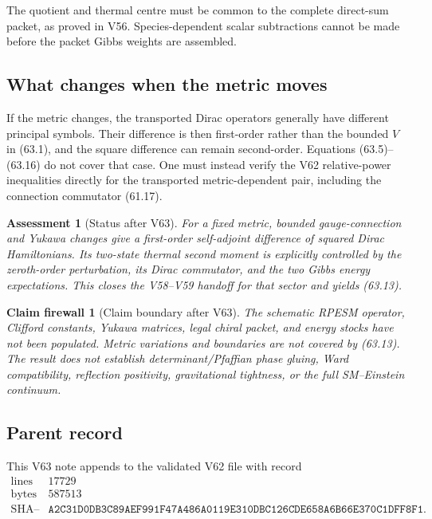 \documentclass[11pt]{article}
\newtheorem{firewall}[theorem]{Claim firewall}
\newtheorem{assessment}[theorem]{Assessment}
\theoremstyle{remark}
\begin{document}
The quotient and thermal centre must be common to the complete
direct-sum packet, as proved in V56.  Species-dependent scalar
subtractions cannot be made before the packet Gibbs weights are
assembled.

\subsection{What changes when the metric moves}

If the metric changes, the transported Dirac operators generally
have different principal symbols.  Their difference is then
first-order rather than the bounded \(V\) in (63.1), and the square
difference can remain second-order.  Equations (63.5)--(63.16) do
not cover that case.  One must instead verify the V62
relative-power inequalities directly for the transported
metric-dependent pair, including the connection commutator
(61.17).

\begin{assessment}[Status after V63]
\label{ass:v12v63-status}
For a fixed metric, bounded gauge-connection and Yukawa changes give
a first-order self-adjoint difference of squared Dirac
Hamiltonians.  Its two-state thermal second moment is explicitly
controlled by the zeroth-order perturbation, its Dirac commutator,
and the two Gibbs energy expectations.  This closes the V58--V59
handoff for that sector and yields (63.13).
\end{assessment}

\begin{firewall}[Claim boundary after V63]
\label{fire:v12v63-claim}
The schematic RPESM operator, Clifford constants, Yukawa matrices,
legal chiral packet, and energy stocks have not been populated.
Metric variations and boundaries are not covered by (63.13).
The result does not establish determinant/Pfaffian phase gluing,
Ward compatibility, reflection positivity, gravitational
tightness, or the full SM--Einstein continuum.
\end{firewall}

\subsection{Parent record}

This V63 note appends to the validated V62 file with record
\[
\begin{array}{c|c}
\text{lines}&17729\\
\text{bytes}&587513\\
\text{SHA--256}&
\texttt{A2C31D0DB3C89AEF991F47A486A0119E310DBC126CDE658A6B66E370C1DFF8F1}.
\end{array}
\]
\end{document}
